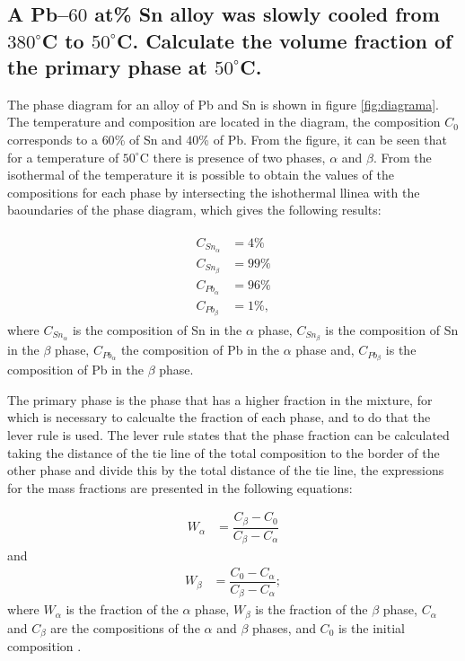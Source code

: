 \section{}

\subsection{A Pb–$60$ at\% Sn alloy was slowly cooled from $380^{\circ}$C to $50^{\circ}$C. Calculate the volume fraction of the primary phase at $50^{\circ}$C.}

The phase diagram for an alloy of Pb and Sn is shown in figure \ref{fig:diagrama}. The temperature and composition are located in the diagram, the composition $C_0$ corresponds to a $60$\% of Sn and $40$\% of Pb. From the figure, it can be seen that for a temperature of $50^{\circ}$C there is presence of two phases, $\alpha$ and $\beta$. From the isothermal of the temperature it is possible to obtain the values of the compositions for each phase by intersecting the ishothermal llinea with the baoundaries of the phase diagram, which gives the following results:

\begin{align}
    \label{eq:compostitions}
    \begin{split}
        C_{Sn_{\alpha}}&=4\% \\ C_{Sn_{\beta}}&=99\% \\ C_{Pb_{\alpha}}&=96\% \\ C_{Pb_{\beta}}&=1\%,
    \end{split}
\end{align}
where $C_{Sn_{\alpha}}$ is the composition of Sn in the $\alpha$ phase, $C_{Sn_{\beta}}$ is the composition of Sn in the $\beta$ phase, $C_{Pb_{\alpha}}$ the composition of Pb in the $\alpha$ phase and, $C_{Pb_{\beta}}$ is the composition of Pb in the $\beta$ phase.

The primary phase is the phase that has a higher fraction in the mixture, for which is necessary to calcualte the fraction of each phase, and to do that the lever rule is used. The lever rule states that the phase fraction can be calculated taking the distance of the tie line of the total composition to the border of the other phase and divide this by the total distance of the tie line, the expressions for the mass fractions are presented in the following equations:

\begin{align}
    \label{eq:frac_alpha}
    W_{\alpha}&=\dfrac{C_{\beta}-C_0}{C_{\beta}-C_{\alpha}}
\end{align}
and
\begin{align}
    \label{eq:frac_beta}
    W_{\beta}&=\dfrac{C_0-C_{\alpha}}{C_{\beta}-C_{\alpha}};
\end{align}
where $W_{\alpha}$ is the fraction of the $\alpha$ phase, $W_{\beta}$ is the fraction of the $\beta$ phase, $C_{\alpha}$ and $C_{\beta}$ are the compositions of the $\alpha$ and $\beta$ phases, and $C_0$ is the initial composition \citep[p.~290-291]{callister2010materials}. 

